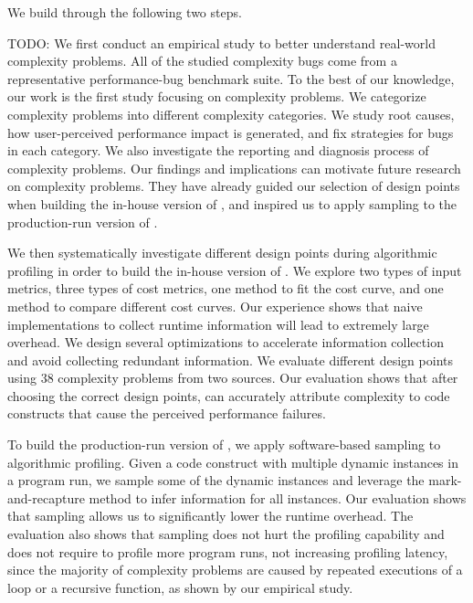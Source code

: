 We build \Tool through the following two steps.

{\color{red} TODO:}
We first conduct an empirical study to better understand
real-world complexity problems.
All of the studied complexity bugs come from a representative
performance-bug benchmark suite\cite{PerfBug,SongOOPSLA2014}.
To the best of our knowledge, our work is the first study focusing on complexity problems.
We categorize complexity problems into different complexity categories.
We study root causes,
how user-perceived performance impact is generated,
and fix strategies for bugs in each category.
We also investigate the reporting and diagnosis process of complexity problems.
Our findings and implications can motivate future research on complexity problems.
They have already guided our selection of design points when building the in-house version of \Tool,
and inspired us to apply sampling to the production-run version of \Tool.

We then systematically investigate different design points during algorithmic profiling
in order to build the in-house version of \Tool.
We explore two types of input metrics,
three types of cost metrics,
one method to fit the cost curve,
and one method to compare different cost curves.
Our experience shows that naive implementations
to collect runtime information
will lead to extremely large overhead.
We design several optimizations to accelerate information collection
and avoid collecting redundant information.
We evaluate different design points
using $38$ complexity problems from two sources.
Our evaluation shows that after choosing the correct design points,
\Tool can accurately attribute complexity to code constructs
that cause the perceived performance failures.
\fi


To build the production-run version of \Tool,
we apply software-based sampling to algorithmic profiling.
Given a code construct with multiple dynamic instances in a program run,
we sample some of the dynamic instances and leverage the mark-and-recapture
method\citep{mark-recapture} to infer information for all instances.
Our evaluation shows that
sampling allows us to significantly lower the runtime overhead.
The evaluation also shows that sampling does not hurt the profiling capability
and does not require to profile more program runs,
not increasing profiling latency, since
the majority of complexity problems are caused by
repeated executions of a loop or a recursive function, as shown by our empirical study.



